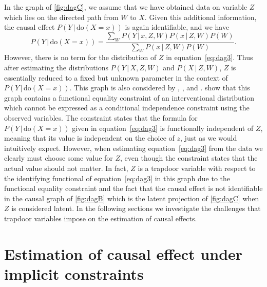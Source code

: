 \documentclass{statsoc}
\newcommand{\+}[1]{\ensuremath{\mathbf{#1}}}
\newcommand{\doo}{\textrm{do}}
\newcommand{\given}{{ \, | \, }}
\newcommand{\z}{trapdoor variable}
\begin{document}
In the graph of \autoref{fig:dagC}, we assume that we have obtained data on variable $Z$ which lies on the directed path from $W$ to $X$. Given this additional information, the causal effect $P(Y \given \doo(X = x))$ is again identifiable, and we have 
\begin{equation}
\label{eq:dag3}
P(Y \given \doo(X = x)) = \frac{\sum_{W}P(Y\given x, Z, W)P(x \given Z, W)P(W)}{\sum_{W}P(x \given Z, W)P(W)}.
\end{equation}
However, there is no term for the distribution of $Z$ in equation~\eqref{eq:dag3}. Thus after estimating the distributions $P(Y \given  X, Z, W)$ and $P(X \given  Z, W)$, $Z$ is essentially reduced to a fixed but unknown parameter in the context of $P(Y \given \doo(X = x))$. This graph is also considered by \citet{TianPearl2002}, \citet{why}, and \citet{jung2020}. \citet{TianPearl2002} show that this graph contains a functional equality constraint of an interventional distribution which cannot be expressed as a conditional independence constraint using the observed variables. The constraint states that the formula for $P(Y \given \doo(X = x))$ given in equation~\eqref{eq:dag3} is functionally independent of $Z$, meaning that its value is independent on the choice of $z$, just as we would intuitively expect. However, when estimating equation~\eqref{eq:dag3} from the data we clearly must choose some value for $Z$, even though the constraint states that the actual value should not matter. In fact, $Z$ is a \z{} with respect to the identifying functional of equation~\eqref{eq:dag3} in this graph due to the functional equality constraint and the fact that the causal effect is not identifiable in the causal graph of \autoref{fig:dagB} which is the latent projection of \autoref{fig:dagC} when $Z$ is considered latent. In the following sections we investigate the challenges that \z s impose on the estimation of causal effects.

\section{Estimation of causal effect under implicit constraints}
\label{sec:estimation}
\end{document}

